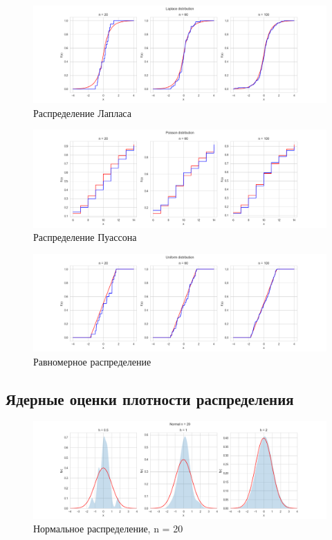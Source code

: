 \documentclass[../main.tex]{subfiles}
\begin{document}
    \begin{figure}[H]
        \centering
        \includegraphics[scale=0.5]{figures/LaplaceEmpirical.png}
        \caption{Распределение Лапласа}
        \label{fig:normal}
    \end{figure}
    
     \begin{figure}[H]
        \centering
        \includegraphics[scale=0.5]{figures/PoissonEmpirical.png}
        \caption{Распределение Пуассона}
        \label{fig:normal}
    \end{figure}
    
    \begin{figure}[H]
        \centering
        \includegraphics[scale=0.5]{figures/UniformEmpirical.png}
        \caption{Равномерное распределение}
        \label{fig:normal}
    \end{figure}
    
    \subsection{Ядерные оценки плотности распределения}
    
    \begin{figure}[H]
        \centering
        \includegraphics[scale=0.5]{figures/NormalNuclear20.png}
        \caption{Нормальное распределение, n = 20}
        \label{fig:normal}
    \end{figure}
    
\end{document}
